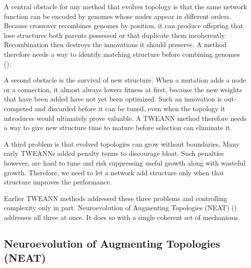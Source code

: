 \documentclass[12pt]{article}
\begin{document}
A central obstacle for any method that evolves topology is that the same network function can be encoded by genomes whose nodes appear in different orders.
Because crossover recombines genomes by position, it can produce offspring that lose structures both parents possessed or that duplicate them incoherently.
Recombination then destroys the innovations it should preserve.
A method therefore needs a way to identify matching structure before combining genomes (\cite{stanley_evolving_2002}).

A second obstacle is the survival of new structure.
When a mutation adds a node or a connection, it almost always lowers fitness at first, because the new weights that have been added have not yet been optimized.
Such an innovation is out-competed and discarded before it can be tuned, even when the topology it introduces would ultimately prove valuable.
A TWEANN method therefore needs a way to give new structure time to mature before selection can eliminate it.

A third problem is that evolved topologies can grow without boundaries.
Many early TWEANNs added penalty terms to discourage bloat.
Such penalties however, are hard to tune and risk suppressing useful growth along with wasteful growth.
Therefore, we need to let a network add structure only when that structure improves the performance.

Earlier TWEANN methods addressed these three problems and controlling complexity only in part.
Neuroevolution of Augmenting Topologies (NEAT) (\cite{stanley_evolving_2002}) addresses all three at once.
It does so with a single coherent set of mechanisms.


\subsection{Neuroevolution of Augmenting Topologies (NEAT)}
\label{subsec:neuroevolution-of-augmenting-topologies-neat}
\end{document}
